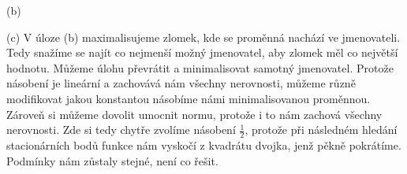(b) %

(c) V úloze (b) maximalisujeme zlomek, kde se proměnná nachází ve jmenovateli. Tedy snažíme se najít co nejmenší možný
jmenovatel, aby zlomek měl co největší hodnotu. Můžeme úlohu převrátit a minimalisovat samotný jmenovatel. Protože
násobení je lineární a zachovává nám všechny nerovnosti, můžeme různě modifikovat jakou konstantou násobíme námi
minimalisovanou proměnnou. Zároveň si můžeme dovolit umocnit normu, protože i to nám zachová všechny nerovnosti. Zde si 
tedy chytře zvolíme násobení $\frac{1}{2}$, protože při následném hledání stacionárních bodů funkce nám vyskočí z kvadrátu 
dvojka, jenž pěkně pokrátíme. Podmínky nám zůstaly stejné, není co řešit.


